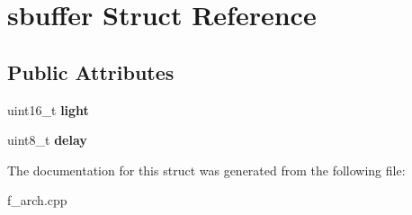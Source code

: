 \hypertarget{structsbuffer}{}\section{sbuffer Struct Reference}
\label{structsbuffer}
\subsection*{Public Attributes}
\begin{DoxyCompactItemize}
\item 
\mbox{\label{structsbuffer_a2e0ec9e69423ddc613b79cf4b35bc27f}} 
uint16\+\_\+t {\bfseries light}
\item 
\mbox{\label{structsbuffer_af97ecf37d1ca95187c32e4a39b14a23f}} 
uint8\+\_\+t {\bfseries delay}
\end{DoxyCompactItemize}


The documentation for this struct was generated from the following file\+:\begin{DoxyCompactItemize}
\item 
f\+\_\+arch.\+cpp\end{DoxyCompactItemize}
